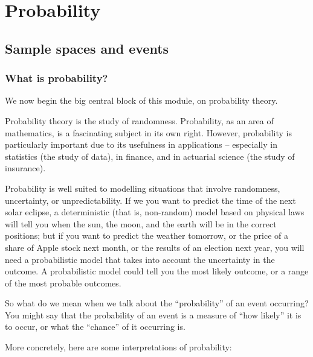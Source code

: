 \documentclass[
  letterpaper,
  DIV=11,
  numbers=noendperiod]{scrreprt}
\theoremstyle{remark}
\begin{document}
\part{Probability}

\hypertarget{L03-events}{%
\chapter{Sample spaces and events}\label{L03-events}}

\renewcommand{\complement}{\mathsf{c}}
\newcommand{\comp}{\complement}
\newcommand{\ff}[2]{{#1}^{\underline{#2}}}

\hypertarget{what-is-prob}{%
\section{What is probability?}\label{what-is-prob}}

We now begin the big central block of this module, on probability
theory.

Probability theory is the study of randomness. Probability, as an area
of mathematics, is a fascinating subject in its own right. However,
probability is particularly important due to its usefulness in
applications -- especially in statistics (the study of data), in
finance, and in actuarial science (the study of insurance).

Probability is well suited to modelling situations that involve
randomness, uncertainty, or unpredictability. If we you want to predict
the time of the next solar eclipse, a deterministic (that is,
non-random) model based on physical laws will tell you when the sun, the
moon, and the earth will be in the correct positions; but if you want to
predict the weather tomorrow, or the price of a share of Apple stock
next month, or the results of an election next year, you will need a
probabilistic model that takes into account the uncertainty in the
outcome. A probabilistic model could tell you the most likely outcome,
or a range of the most probable outcomes.

So what do we mean when we talk about the ``probability'' of an event
occurring? You might say that the probability of an event is a measure
of ``how likely'' it is to occur, or what the ``chance'' of it occurring
is.

More concretely, here are some interpretations of probability:
\end{document}
